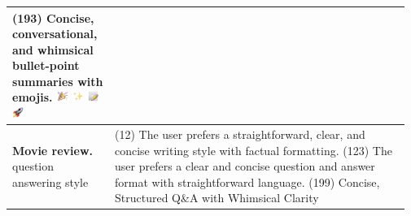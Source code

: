 \begin{table}[t!]
\begin{tabular}{p{0.25\linewidth} p{0.72\linewidth}}
                \newline
                    (193) Concise, conversational, and whimsical bullet-point summaries with emojis. \includegraphics[height=10pt]{graphs/tada.png} \includegraphics[height=10pt]{graphs/sparkles.png} \includegraphics[height=10pt]{graphs/write.png} \includegraphics[height=10pt]{graphs/rocket.png} \\
        \midrule
        \textbf{Movie review.} question answering style & (12) The user prefers a straightforward, clear, and concise writing style with factual formatting.
        \newline (123) The user prefers a clear and concise question and answer format with straightforward language. 
        \newline (199) Concise, Structured Q\&A with Whimsical Clarity \\
            
                
               
        \bottomrule
    \end{tabular} 
    \label{tab:learned_prefs}
\end{table}










